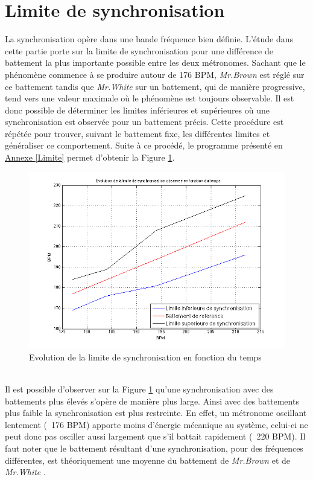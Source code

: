 \documentclass[a4paper,11pt]{report}
\begin{document}
\section{Limite de synchronisation}
La synchronisation opère dans une bande fréquence bien définie. L'étude dans cette partie porte sur la limite de synchronisation pour une différence de battement la plus importante possible entre les deux métronomes. Sachant que le phénomène commence à se produire autour de 176 BPM, {\it Mr.Brown} est réglé sur ce battement tandis que {\it Mr.White} sur un battement, qui de manière progressive, tend vers une valeur maximale où le phénomène est toujours observable. Il est donc possible de déterminer les limites inférieures et supérieures où une synchronisation est observée pour un battement précis. Cette procédure est répétée pour trouver, suivant le battement fixe, les différentes limites et généraliser ce comportement. Suite à ce procédé, le programme présenté en \underline{Annexe \ref{Limite}} permet d'obtenir la Figure \ref{LimiteF}.
\begin{figure}[h]
\centering
\includegraphics[width=1\textwidth]{CourbeLimiteSynchro}
\caption{Evolution de la limite de synchronisation en fonction du temps}\label{LimiteF}
\end{figure}\\
Il est possible d'observer sur la Figure \ref{LimiteF} qu'une synchronisation avec des battements plus élevés s'opère de manière plus large. Ainsi avec des battements plus faible la synchronisation est plus restreinte. En effet, un métronome oscillant lentement (~176 BPM) apporte moins d'énergie mécanique au système, celui-ci ne peut donc pas osciller aussi largement que s'il battait rapidement (~220 BPM). Il faut noter que le battement résultant d'une synchronisation, pour des fréquences différentes, est théoriquement une moyenne du battement de {\it Mr.Brown} et de {\it Mr.White} \cite{piko}.
\end{document}
